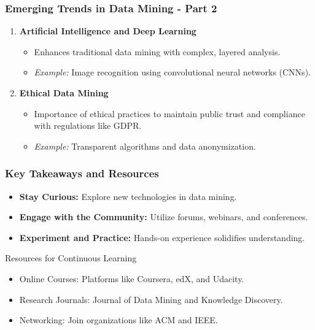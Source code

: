 \documentclass{beamer}
\begin{document}
\begin{frame}[fragile]
    \frametitle{Emerging Trends in Data Mining - Part 2}
    \begin{enumerate}[resume]
        \item \textbf{Artificial Intelligence and Deep Learning}
            \begin{itemize}
                \item Enhances traditional data mining with complex, layered analysis.
                \item \textit{Example:} Image recognition using convolutional neural networks (CNNs).
            \end{itemize}
        
        \item \textbf{Ethical Data Mining}
            \begin{itemize}
                \item Importance of ethical practices to maintain public trust and compliance with regulations like GDPR.
                \item \textit{Example:} Transparent algorithms and data anonymization.
            \end{itemize}
    \end{enumerate}    
\end{frame}

\begin{frame}[fragile]
    \frametitle{Key Takeaways and Resources}
    \begin{itemize}
        \item \textbf{Stay Curious:} Explore new technologies in data mining.
        \item \textbf{Engage with the Community:} Utilize forums, webinars, and conferences.
        \item \textbf{Experiment and Practice:} Hands-on experience solidifies understanding.
    \end{itemize}
    \begin{block}{Resources for Continuous Learning}
        \begin{itemize}
            \item Online Courses: Platforms like Coursera, edX, and Udacity.
            \item Research Journals: Journal of Data Mining and Knowledge Discovery.
            \item Networking: Join organizations like ACM and IEEE.
        \end{itemize}
    \end{block}
\end{frame}
\end{document}

